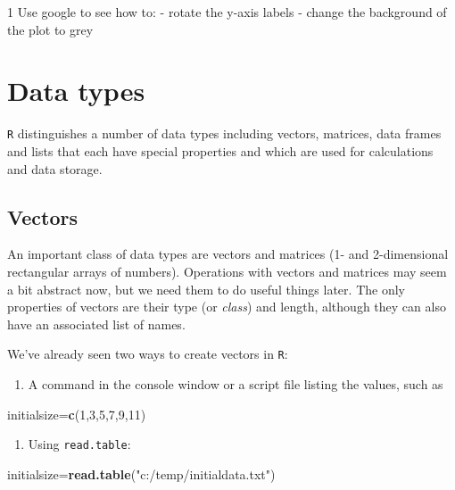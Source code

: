\documentclass[11pt,]{article}
\newenvironment{Shaded}{\begin{snugshade}}{\end{snugshade}}
\newcommand{\DecValTok}[1]{\textcolor[rgb]{0.00,0.00,0.81}{#1}}
\newcommand{\KeywordTok}[1]{\textcolor[rgb]{0.13,0.29,0.53}{\textbf{#1}}}
\newcommand{\NormalTok}[1]{#1}
\newcommand{\StringTok}[1]{\textcolor[rgb]{0.31,0.60,0.02}{#1}}
\providecommand{\tightlist}{%
  \setlength{\itemsep}{0pt}\setlength{\parskip}{0pt}}
\let\BeginKnitrBlock\begin \let\EndKnitrBlock\end
\begin{document}
\BeginKnitrBlock{exercisebox}{1}
Use google to see how to:
- rotate the y-axis labels
- change the background of the plot to grey
\EndKnitrBlock{exercisebox}

\hypertarget{data-types}{%
\section{Data types}\label{data-types}}

\texttt{R} distinguishes a number of data types including vectors, matrices, data frames and lists that each have special properties and which are used for calculations and data storage.

\hypertarget{vectors}{%
\subsection{Vectors}\label{vectors}}

An important class of data types are vectors and matrices (1- and 2-dimensional rectangular arrays of numbers). Operations with vectors and matrices may seem a bit abstract now, but we need them to do useful things later. The only properties of vectors are their type (or \emph{class}) and length, although they can also have an associated list of names.

We've already seen two ways to create vectors in \texttt{R}:

\begin{enumerate}
\def\labelenumi{\arabic{enumi}.}
\tightlist
\item
  A command in the console window or a script file listing the values,
  such as
\end{enumerate}

\begin{Shaded}
\begin{Highlighting}[]
\NormalTok{initialsize=}\KeywordTok{c}\NormalTok{(}\DecValTok{1}\NormalTok{,}\DecValTok{3}\NormalTok{,}\DecValTok{5}\NormalTok{,}\DecValTok{7}\NormalTok{,}\DecValTok{9}\NormalTok{,}\DecValTok{11}\NormalTok{)}
\end{Highlighting}
\end{Shaded}

\begin{enumerate}
\def\labelenumi{\arabic{enumi}.}
\setcounter{enumi}{1}
\tightlist
\item
  Using \texttt{read.table}:
\end{enumerate}

\begin{Shaded}
\begin{Highlighting}[]
\NormalTok{initialsize=}\KeywordTok{read.table}\NormalTok{(}\StringTok{"c:/temp/initialdata.txt"}\NormalTok{)}
\end{Highlighting}
\end{Shaded}
\end{document}

